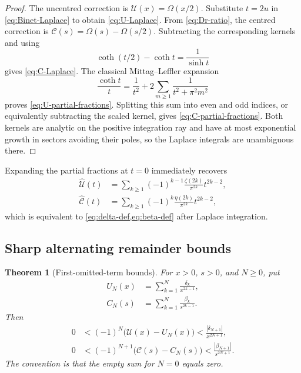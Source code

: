 \documentclass[11pt,a4paper,oneside]{article}
\theoremstyle{plain}
\newtheorem{theorem}{Theorem}[section]
\theoremstyle{definition}
\theoremstyle{remark}
\newcommand{\etaD}{\eta}
\begin{document}
\begin{proof}
The uncentred correction is $\mathcal U(x)=\Omega(x/2)$.  Substitute $t=2u$
in \cref{eq:Binet-Laplace} to obtain \cref{eq:U-Laplace}.  From
\cref{eq:Dr-ratio}, the centred correction is
$\mathcal C(s)=\Omega(s)-\Omega(s/2)$.  Subtracting the corresponding kernels
and using
\[
 \coth(t/2)-\coth t=\frac1{\sinh t}
\]
gives \cref{eq:C-Laplace}.  The classical Mittag--Leffler expansion
\[
 \frac{\coth t}{t}=\frac1{t^2}
 +2\sum_{m\ge1}\frac1{t^2+\pi^2m^2}
\]
proves \cref{eq:U-partial-fractions}.  Splitting this sum into even and odd
indices, or equivalently subtracting the scaled kernel, gives
\cref{eq:C-partial-fractions}.  Both kernels are analytic on the positive
integration ray and have at most exponential growth in sectors avoiding their
poles, so the Laplace integrals are unambiguous there.
\end{proof}

Expanding the partial fractions at $t=0$ immediately recovers
\begin{align}
 \widehat{\mathcal U}(t)
 &=\sum_{k\ge1}(-1)^{k-1}
   \frac{\zeta(2k)}{\pi^{2k}}t^{2k-2},
 \label{eq:U-borel-series}\\
 \widehat{\mathcal C}(t)
 &=\sum_{k\ge1}(-1)^k
   \frac{\etaD(2k)}{\pi^{2k}}t^{2k-2},
 \label{eq:C-borel-series}
\end{align}
which is equivalent to \cref{eq:delta-def,eq:beta-def} after Laplace
integration.

\subsection{Sharp alternating remainder bounds}

\begin{theorem}[First-omitted-term bounds]
\label{thm:remainder-bounds}
For $x>0$, $s>0$, and $N\ge0$, put
\begin{align}
 U_N(x)&=\sum_{k=1}^{N}\frac{\delta_k}{x^{2k-1}},
 \label{eq:UN-def}\\
 C_N(s)&=\sum_{k=1}^{N}\frac{\beta_k}{s^{2k-1}}.
 \label{eq:CN-def}
\end{align}
Then
\begin{align}
 0&<(-1)^N\bigl(\mathcal U(x)-U_N(x)\bigr)
 <\frac{|\delta_{N+1}|}{x^{2N+1}},
 \label{eq:U-remainder-bound}\\
 0&<(-1)^{N+1}\bigl(\mathcal C(s)-C_N(s)\bigr)
 <\frac{|\beta_{N+1}|}{s^{2N+1}}.
 \label{eq:C-remainder-bound}
\end{align}
The convention is that the empty sum for $N=0$ equals zero.
\end{theorem}
\end{document}
